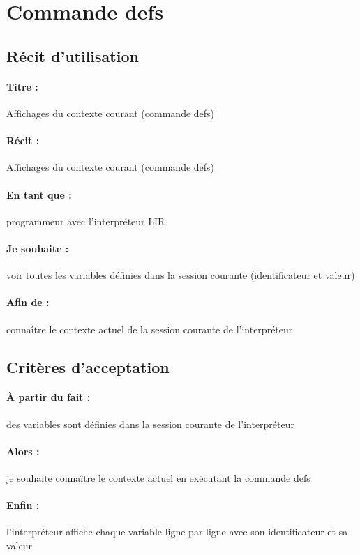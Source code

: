     \section{Commande defs}
    \subsection*{Récit d'utilisation}

    \paragraph{Titre : } Affichages du contexte courant (commande defs) %
    \paragraph{Récit : } Affichages du contexte courant (commande defs) %
    \paragraph{En tant que : } programmeur avec l'interpréteur LIR %
    \paragraph{Je souhaite : } voir toutes les variables définies dans la session courante (identificateur et valeur)
    \paragraph{Afin de : } connaître le contexte actuel de la session courante de l'interpréteur

    \subsection*{Critères d'acceptation}

    \paragraph{À partir du fait : } des variables sont définies dans la session courante de l'interpréteur
    \paragraph{Alors : } je souhaite connaître le contexte actuel en exécutant la commande defs
    \paragraph{Enfin : } l'interpréteur affiche chaque variable ligne par ligne avec son identificateur et sa valeur
